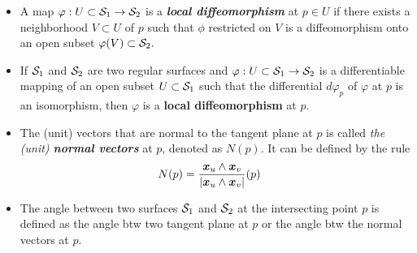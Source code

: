 \documentclass[11pt]{article}
\begin{document}
\begin{itemize}
\item \begin{definition}
A map $\varphi: U\subset {\mathcal S}_{1} \rightarrow {\mathcal S}_{2}$ is a \emph{\textbf{local diffeomorphism}} at $p\in U$ if there exists a neighborhood $V\subset U$ of $p$ such that $\phi$ restricted on $V$ is a diffeomorphism onto an open subset $\varphi(V)\subset {\mathcal S}_{2}. $ 
\end{definition}


\item 
\begin{theorem}
If ${\mathcal S}_{1}$ and ${\mathcal S}_{2}$ are two regular surfaces and $\varphi: U\subset {\mathcal S}_{1} \rightarrow {\mathcal S}_{2}$ is a differentiable mapping of an open subset $U\subset {\mathcal S}_{1}$ such that the differential $d\varphi_{p}$ of $\varphi$ at $p$ is an isomorphism, then $\varphi$ is a \textbf{local diffeomorphism} at $p$.
\end{theorem}


\item \begin{definition}
The (unit)  vectors that are normal to the tangent plane at $p$ is called \emph{the (unit) \textbf{normal vectors}} at $p$, denoted as $N(p)$.  It can be defined by the rule
\begin{align*}
N(p) &= \frac{\boldsymbol{x}_{u} \wedge \boldsymbol{x}_{v}}{\left\lvert \boldsymbol{x}_{u} \wedge \boldsymbol{x}_{v} \right\rvert}(p)
\end{align*}
\end{definition}

\item The angle between two surfaces ${\mathcal S}_{1}$ and ${\mathcal S}_{2}$ at the intersecting point $p$ is defined as the angle btw two tangent plane at $p$ or the angle btw the normal vectors at $p$.

\end{itemize}
\end{document}
